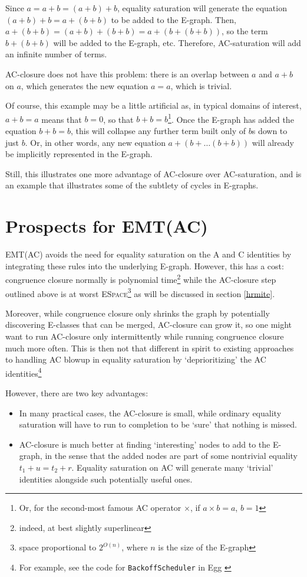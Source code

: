 \documentclass[12pt,a4paper,twoside,openright]{report}
\numberwithin{equation}{chapter}		%
\numberwithin{figure}{chapter}			%
\numberwithin{table}{chapter}			%
\theoremstyle{definition}
\theoremstyle{plain}
\begin{document}
Since $a = a + b = (a + b) + b$, equality saturation will generate the equation $(a + b) + b = a + (b + b)$ to be added to the E-graph. Then, $a + (b + b) = (a + b) + (b + b) = a + (b + (b + b))$, so the term $b + (b + b)$ will be added to the E-graph, etc. Therefore, AC-saturation will add an infinite number of terms.

AC-closure does not have this problem: there is an overlap between $a$ and $a + b$ on $a$, which generates the new equation $a = a$, which is trivial.

Of course, this example may be a little artificial as, in typical domains of interest, $a + b = a$ means that $b = 0$, so that $b + b = b$\footnote{Or, for the second-most famous AC operator $\times$, if $a \times b = a$, $b = 1$}. Once the E-graph has added the equation $b + b = b$, this will collapse any further term built only of $b$s down to just $b$. Or, in other words, any new equation $a + (b + \ldots (b + b))$ will already be implicitly represented in the E-graph.

Still, this illustrates one more advantage of AC-closure over AC-saturation, and is an example that illustrates some of the subtlety of cycles in E-graphs.

\section{Prospects for EMT(AC)}
EMT(AC) avoids the need for equality saturation on the A and C identities by integrating these rules into the underlying E-graph. However, this has a cost: congruence closure normally is polynomial time\footnote{indeed, at best slightly superlinear} while the AC-closure step outlined above is at worst \textsc{ESpace}\footnote{space proportional to $2^{O(n)}$, where $n$ is the size of the E-graph} as will be discussed in section \ref{hrmite}.

Moreover, while congruence closure only shrinks the graph by potentially discovering E-classes that can be merged, AC-closure can grow it, so one might want to run AC-closure only intermittently while running congruence closure much more often. This is then not that different in spirit to existing approaches to handling AC blowup in equality saturation by `deprioritizing' the AC identities\footnote{For example, see the code for \texttt{BackoffScheduler} in Egg \cite{willsey_egg_2026}}

However, there are two key advantages:
\begin{itemize}
\item In many practical cases, the AC-closure is small, while ordinary equality saturation will have to run to completion to be `sure' that nothing is missed.
\item AC-closure is much better at finding `interesting' nodes to add to the E-graph, in the sense that the added nodes are part of some nontrivial equality $t_1 + u = t_2 + r$. Equality saturation on AC will generate many `trivial' identities alongside such potentially useful ones.
\end{itemize}
\end{document}
